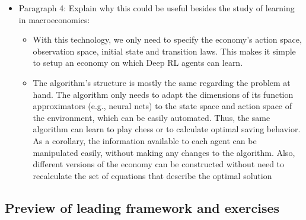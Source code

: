 \documentclass[11pt,english]{article}
\begin{document}
\begin{itemize}
		\item Paragraph 4: Explain why this could be useful besides the study of learning in macroeconomics: \medskip 
	
	\begin{itemize}
		\item With this technology, we only need to specify the economy's action space, observation space, initial state and transition laws. This makes it simple to setup an economy on which Deep RL agents can learn. \medskip
		
		\item The algorithm's structure is mostly the same regarding the problem at hand. The algorithm only needs to adapt the dimensions of its function approximators (e.g., neural nets) to the state space and action space of the environment, which can be easily automated. Thus, the same algorithm can learn to play chess or to calculate optimal saving behavior. As a corollary, the information available to each agent can be manipulated easily, without making any changes to the algorithm. Also, different versions of the economy can be constructed without need to recalculate the set of equations that describe the optimal solution  \medskip
	\end{itemize}

	\end{itemize}

	\subsection{Preview of leading framework and exercises} 
	
\end{document}
